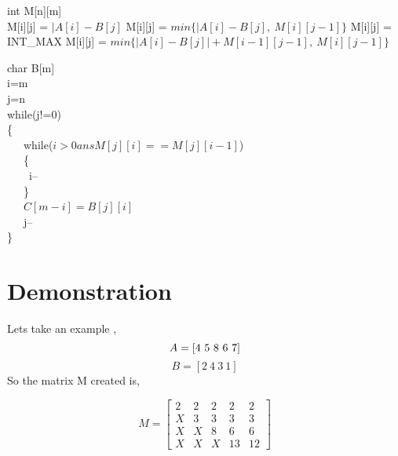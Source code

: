 \documentclass{article}
\begin{document}
    \begin{algorithm}[H]
	int M[n][m]\\
	{
		{
			{
				{
					M[i][j] = ${|A[i] - B[j]}$ \;
				}
				\Else
				{
					M[i][j] = ${min\{|A[i] - B[j],\ M[i][j-1]\}}$ \;
				}
			}
			{
				M[i][j] = INT\_MAX \;
			}
			\Else
			{
				M[i][j] = ${min\{|A[i] - B[j]| + M[i-1][j-1],\ M[i][j-1]\}}$ \;
			}
		}
	}
	
	
	
	char B[m]\\
	i=m\\
	j=n\\
	
	while(j!=0)\\
	\{\\
		\ \ \ while($i>0 ans M[j][i]==M[j][i-1]$)\\
	\ \ \ 	\{\\
		\ \ \ \ 	i--\\
		\ \ \ \}\\
		\ \ \ $C[m-i]=B[j][i]$\\
		\ \ \ j--\\
	\}\\
	
	

     \end{algorithm}
  
  \section{Demonstration}
  
  Lets take an example ,
  \begin{equation*}
  	A=[4\ 5\ 8\ 6\ 7]\\
  \end{equation*}
  \begin{equation*}
 	 B=[2\ 4\ 3\ 1]
  \end{equation*}
  So the matrix M created is,
   
  \begin{equation*}
 	 M=\left[\begin{matrix}
 	 	2 & 2 & 2 & 2 & 2\\
 	 	X & 3 & 3 & 3 & 3\\
 	 	X & X & 8 & 6 & 6\\
 	 	X & X & X & 13 & 12
 	 \end{matrix}\right]
  \end{equation*}
  
\end{document}

